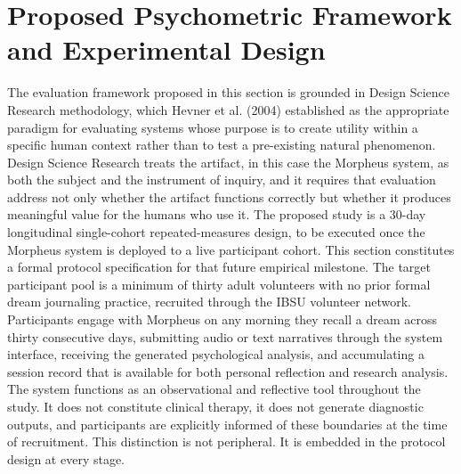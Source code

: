 \documentclass[12pt,a4paper]{report}
\begin{document}
\section{Proposed Psychometric Framework and Experimental Design}
The evaluation framework proposed in this section is grounded in Design Science Research methodology, which Hevner et al. (2004) established as the appropriate paradigm for evaluating systems whose purpose is to create utility within a specific human context rather than to test a pre-existing natural phenomenon. Design Science Research treats the artifact, in this case the Morpheus system, as both the subject and the instrument of inquiry, and it requires that evaluation address not only whether the artifact functions correctly but whether it produces meaningful value for the humans who use it. The proposed study is a \num{30}-day longitudinal single-cohort repeated-measures design, to be executed once the Morpheus system is deployed to a live participant cohort. This section constitutes a formal protocol specification for that future empirical milestone. The target participant pool is a minimum of thirty adult volunteers with no prior formal dream journaling practice, recruited through the IBSU volunteer network. Participants engage with Morpheus on any morning they recall a dream across thirty consecutive days, submitting audio or text narratives through the system interface, receiving the generated psychological analysis, and accumulating a session record that is available for both personal reflection and research analysis. The system functions as an observational and reflective tool throughout the study. It does not constitute clinical therapy, it does not generate diagnostic outputs, and participants are explicitly informed of these boundaries at the time of recruitment. This distinction is not peripheral. It is embedded in the protocol design at every stage.
\end{document}
